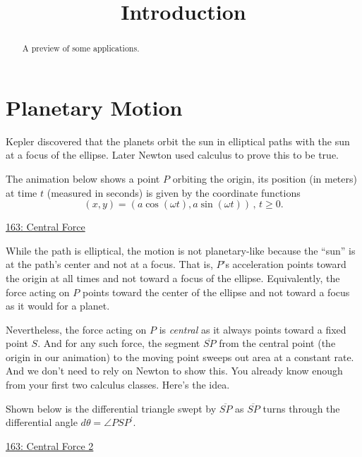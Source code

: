 \documentclass{ximera}
\title{Introduction}
\begin{document}
\begin{abstract}
A preview of some applications.
\end{abstract}
\maketitle


\section*{Planetary Motion}
Kepler discovered that the planets orbit the sun in elliptical paths with the sun at a focus of the ellipse. Later Newton used calculus to prove this to be true. 

The animation below shows a point $P$ orbiting the origin, its position (in meters) at time $t$ (measured in seconds) is given by the coordinate functions
\[
       (x,y) = (a \cos (\omega t), a \sin(\omega t)) \, , \, t \geq 0.
\]

\begin{exploration}
\begin{onlineOnly}
    \begin{center}
\end{center}
\end{onlineOnly}

\href{https://www.desmos.com/calculator/5aq0sta5aa}{163: Central Force}
\end{exploration}


While the path is elliptical, the motion is not planetary-like because the ``sun'' is at the path's center and not at a focus. That is,  $P$'s acceleration points toward the origin at all times and not toward a focus of the ellipse. Equivalently, the force acting on $P$ points toward the center of the ellipse and not toward a focus as it would for a planet. %

Nevertheless, the force acting on $P$ is \emph{central} as it always points toward a fixed point $S$. And for any such force, the segment $\overline{SP}$ from the central point (the origin in our animation) to the moving point sweeps out area at a constant rate. And we don't need to rely on Newton to show this. You already know enough from your first two calculus classes. Here's the idea.


\begin{exploration}
Shown below is the differential triangle swept by $\overline{SP}$ as $\overline{SP}$ turns through the differential angle $d\theta = \angle PSP^\prime$.
\begin{onlineOnly}
    \begin{center}
\end{center}
\end{onlineOnly}

\href{https://www.desmos.com/calculator/6woyc0rx1b}{163: Central Force 2}
\end{exploration}
\end{document}
